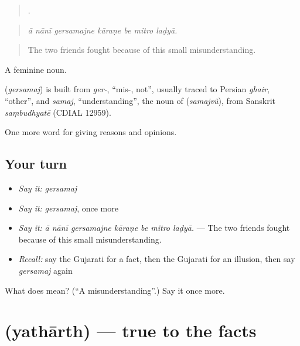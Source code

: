 \begin{quote}
      .
\end{quote}

\begin{quote}
\emph{ā nānī gersamajne kāraṇe be mitro laḍyā.}
\end{quote}

\begin{quote}
The two friends fought because of this small misunderstanding.
\end{quote}

A feminine noun.

\begin{cousinweb}
\textbf{} (\emph{gersamaj}) is built from \emph{ger-}, \textquotedblleft{}mis-, not\textquotedblright{}, usually traced to Persian \emph{ghair}, \textquotedblleft{}other\textquotedblright{}, and \emph{samaj}, \textquotedblleft{}understanding\textquotedblright{}, the noun of \textbf{} (\emph{samajvũ}), from Sanskrit \emph{saṃbudhyatē} (CDIAL 12959).
\end{cousinweb}

\begin{grammarlens}[title={What you've built}]
One more word for giving reasons and opinions.
\end{grammarlens}

\subsection*{Your turn}
\begin{itemize}
\raggedright
  \item \emph{Say it:} \emph{gersamaj}
  \item \emph{Say it:} \emph{gersamaj}, once more
  \item \emph{Say it:} \emph{ā nānī gersamajne kāraṇe be mitro laḍyā.} — The two friends fought because of this small misunderstanding.
  \item \emph{Recall:} say the Gujarati for a fact, then the Gujarati for an illusion, then say \emph{gersamaj} again
\end{itemize}

\begin{tcolorbox}[breakable,colback=teal!4,colframe=teal!35!black,title={Before you move on}]
What does  mean? (\textquotedblleft{}A misunderstanding\textquotedblright{}.) Say it once more.
\end{tcolorbox}
\section[\texorpdfstring{\gu{યથાર્થ} (yathārth)}{યથાર્થ (yathārth)}]{ (yathārth) — true to the facts}

